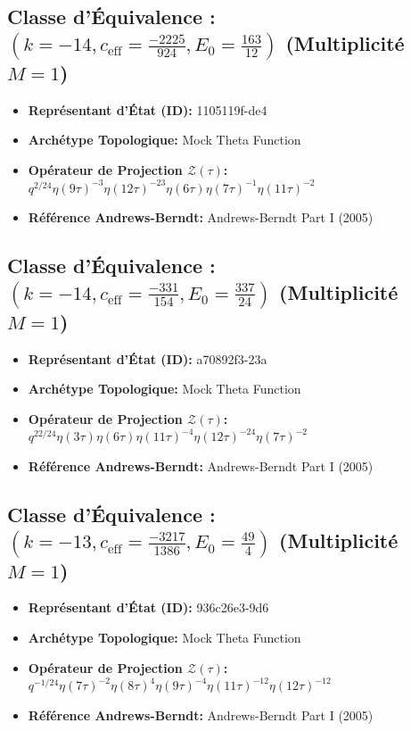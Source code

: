 \documentclass[11pt,twoside,openright]{book}
\begin{document}
\subsection*{Classe d'Équivalence : $(k=-14, c_{\text{eff}}=\frac{-2225}{924}, E_0=\frac{163}{12})$ (Multiplicité $M=1$)}
\begin{itemize}
  \item \textbf{Représentant d'État (ID):} 1105119f-de4
  \item \textbf{Archétype Topologique:} Mock Theta Function
  \item \textbf{Opérateur de Projection $\mathcal{Z}(\tau)$:} $q^{2/24} \eta(9\tau)^{-3} \eta(12\tau)^{-23} \eta(6\tau) \eta(7\tau)^{-1} \eta(11\tau)^{-2}$
  \item \textbf{Référence Andrews-Berndt:} Andrews-Berndt Part I (2005)
\end{itemize}

\subsection*{Classe d'Équivalence : $(k=-14, c_{\text{eff}}=\frac{-331}{154}, E_0=\frac{337}{24})$ (Multiplicité $M=1$)}
\begin{itemize}
  \item \textbf{Représentant d'État (ID):} a70892f3-23a
  \item \textbf{Archétype Topologique:} Mock Theta Function
  \item \textbf{Opérateur de Projection $\mathcal{Z}(\tau)$:} $q^{22/24} \eta(3\tau) \eta(6\tau) \eta(11\tau)^{-4} \eta(12\tau)^{-24} \eta(7\tau)^{-2}$
  \item \textbf{Référence Andrews-Berndt:} Andrews-Berndt Part I (2005)
\end{itemize}

\subsection*{Classe d'Équivalence : $(k=-13, c_{\text{eff}}=\frac{-3217}{1386}, E_0=\frac{49}{4})$ (Multiplicité $M=1$)}
\begin{itemize}
  \item \textbf{Représentant d'État (ID):} 936c26e3-9d6
  \item \textbf{Archétype Topologique:} Mock Theta Function
  \item \textbf{Opérateur de Projection $\mathcal{Z}(\tau)$:} $q^{-1/24} \eta(7\tau)^{-2} \eta(8\tau)^{4} \eta(9\tau)^{-4} \eta(11\tau)^{-12} \eta(12\tau)^{-12}$
  \item \textbf{Référence Andrews-Berndt:} Andrews-Berndt Part I (2005)
\end{itemize}
\end{document}
